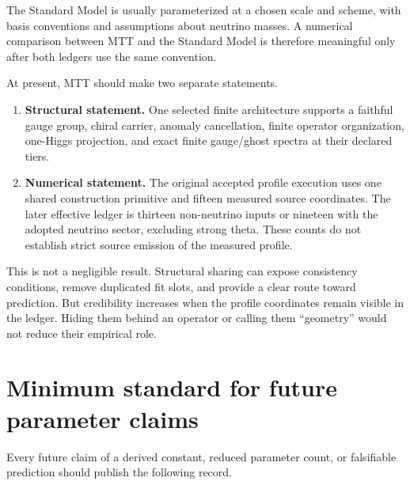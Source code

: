 \documentclass[11pt]{article}
\begin{document}
The Standard Model is usually parameterized at a chosen scale and scheme,
with basis conventions and assumptions about neutrino masses. A numerical
comparison between MTT and the Standard Model is therefore meaningful only
after both ledgers use the same convention.

At present, MTT should make two separate statements.
\begin{enumerate}
\item \textbf{Structural statement.} One selected finite architecture
supports a faithful gauge group, chiral carrier, anomaly cancellation,
finite operator organization, one-Higgs projection, and exact finite
gauge/ghost spectra at their declared tiers.
\item \textbf{Numerical statement.} The original accepted profile execution
uses one shared construction primitive and fifteen measured source
coordinates. The later effective ledger is thirteen non-neutrino inputs or
nineteen with the adopted neutrino sector, excluding strong theta. These
counts do not establish strict source emission of the measured profile.
\end{enumerate}

This is not a negligible result. Structural sharing can expose consistency
conditions, remove duplicated fit slots, and provide a clear route toward
prediction. But credibility increases when the profile coordinates remain
visible in the ledger. Hiding them behind an operator or calling them
``geometry'' would not reduce their empirical role.

\section{Minimum standard for future parameter claims}

Every future claim of a derived constant, reduced parameter count, or
falsifiable prediction should publish the following record.
\end{document}
